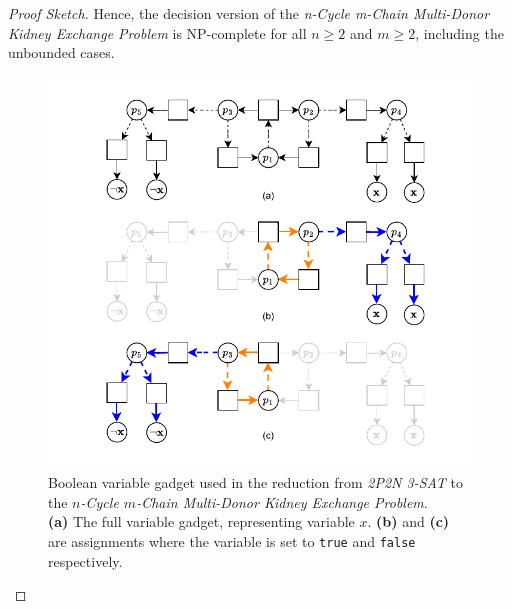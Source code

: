 \begin{lemma}
\begin{proof}[Proof Sketch]
Hence, the decision version of the \textit{n-Cycle m-Chain Multi-Donor Kidney Exchange Problem} is NP-complete for all $n \ge 2$ and $m \ge 2$, including the unbounded cases.

\begin{figure}
    \centering
    \includegraphics{data/sat_reduction_boolean_gadget2.pdf}
    \caption[Boolean variable gadget used in the reduction from \textit{2P2N 3-SAT} to the \textit{$n$-Cycle $m$-Chain Multi-Donor Kidney Exchange Problem}]{Boolean variable gadget used in the reduction from \textit{2P2N 3-SAT} to the \textit{$n$-Cycle $m$-Chain Multi-Donor Kidney Exchange Problem}.\\
    \textbf{(a)} The full variable gadget, representing variable \(x\). \textbf{(b)} and \textbf{(c)} are assignments where the variable is set to \texttt{true} and \texttt{false} respectively.}\label{fig:sat_reduction_boolean_gadget2}
\end{figure}

\end{proof}
\end{lemma}



